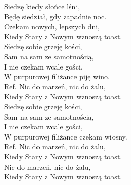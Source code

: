 
\begin{flushleft}
Siedzę kiedy słońce lśni, \\
Będę siedział, gdy zapadnie noc. \\
Czekam nowych, lepszych dni, \\
Kiedy Stary z Nowym wznoszą toast. \\
\vskip 3mm
Siedzę sobie grzeję kości, \\
Sam na sam ze samotnością, \\
I nie czekam wcale gości, \\
W purpurowej filiżance piję wino. \\
\vskip 3mm
Ref. Nic do marzeń, nic do żalu,\\
\hspace{0.9cm}Kiedy Stary z Nowym wznoszą toast. \\
\vskip 3mm
Siedzę sobie grzeję kości, \\
Sam na sam ze samotnością, \\
I nie czekam wcale gości, \\
W purpurowej filiżance czekam wiosny. \\
\vskip 3mm
Ref. Nic do marzeń, nic do żalu,\\
\hspace{0.9cm}Kiedy Stary z Nowym wznoszą toast. \\
\vskip 3mm
\hspace{0.9cm}Nic do marzeń, nic do żalu, \\
\hspace{0.9cm}Kiedy Stary z Nowym wznoszą toast. \\
\end{flushleft}
\clearpage
